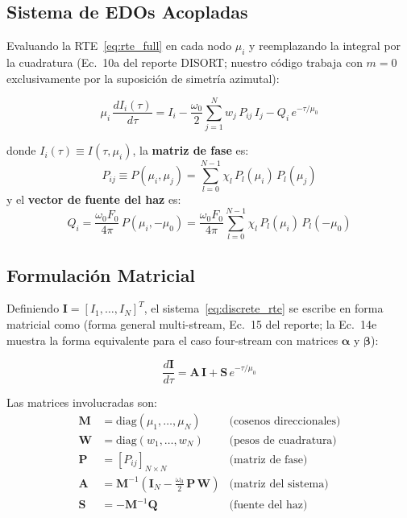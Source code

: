 \documentclass[a4paper,11pt]{article}
\begin{document}

\subsection{Sistema de EDOs Acopladas}

Evaluando la RTE~\eqref{eq:rte_full} en cada nodo $\mu_i$ y reemplazando la
integral por la cuadratura (Ec.~10a del reporte DISORT; nuestro c\'odigo
trabaja con $m=0$ exclusivamente por la suposici\'on de simetr\'ia azimutal):

\begin{equation}\label{eq:discrete_rte}
    \mu_i\,\frac{dI_i(\tau)}{d\tau} = I_i
    - \frac{\omega_0}{2}\sum_{j=1}^{N}w_j\,P_{ij}\,I_j
    - Q_i\,e^{-\tau/\mu_0}
\end{equation}

donde $I_i(\tau) \equiv I(\tau,\mu_i)$, la \textbf{matriz de fase} es:
\begin{equation}\label{eq:phase_matrix}
    P_{ij} \equiv P(\mu_i,\mu_j) = \sum_{l=0}^{N-1}\chi_l\,P_l(\mu_i)\,P_l(\mu_j)
\end{equation}
y el \textbf{vector de fuente del haz} es:
\begin{equation}\label{eq:beam_source}
    Q_i = \frac{\omega_0 F_0}{4\pi}\,P(\mu_i,-\mu_0)
    = \frac{\omega_0 F_0}{4\pi}\sum_{l=0}^{N-1}\chi_l\,P_l(\mu_i)\,P_l(-\mu_0)
\end{equation}


\subsection{Formulaci\'on Matricial}

Definiendo $\mathbf{I} = [I_1,\ldots,I_N]^T$, el sistema~\eqref{eq:discrete_rte}
se escribe en forma matricial como (forma general multi-stream, Ec.~15 del reporte;
la Ec.~14e muestra la forma equivalente para el caso four-stream con matrices
$\bm{\alpha}$ y $\bm{\beta}$):

\begin{equation}\label{eq:matrix_ode}
    \boxed{\frac{d\mathbf{I}}{d\tau} = \mathbf{A}\,\mathbf{I}
    + \mathbf{S}\,e^{-\tau/\mu_0}}
\end{equation}

Las matrices involucradas son:
\begin{align}
    \mathbf{M} &= \text{diag}(\mu_1,\ldots,\mu_N)
    &\text{(cosenos direccionales)}\label{eq:M_def}\\
    \mathbf{W} &= \text{diag}(w_1,\ldots,w_N)
    &\text{(pesos de cuadratura)}\label{eq:W_def}\\
    \mathbf{P} &= [P_{ij}]_{N\times N}
    &\text{(matriz de fase)}\label{eq:P_def}\\
    \mathbf{A} &= \mathbf{M}^{-1}\!\left(\mathbf{I}_N
    - \tfrac{\omega_0}{2}\,\mathbf{P}\,\mathbf{W}\right)
    &\text{(matriz del sistema)}\label{eq:A_def}\\
    \mathbf{S} &= -\mathbf{M}^{-1}\mathbf{Q}
    &\text{(fuente del haz)}\label{eq:S_def}
\end{align}
\end{document}
